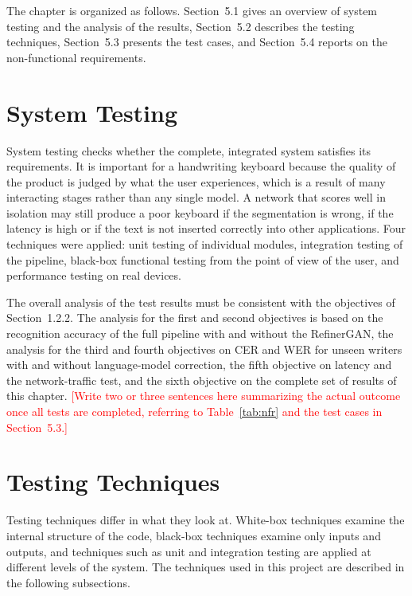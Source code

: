 \documentclass[12pt,a4paper]{report}
\newcommand{\todo}[1]{\textcolor{red}{[#1]}}
\begin{document}
The chapter is organized as follows. Section~5.1 gives an overview of system testing and the analysis of the results, Section~5.2 describes the testing techniques, Section~5.3 presents the test cases, and Section~5.4 reports on the non-functional requirements.

\section{System Testing}
System testing checks whether the complete, integrated system satisfies its requirements. It is important for a handwriting keyboard because the quality of the product is judged by what the user experiences, which is a result of many interacting stages rather than any single model. A network that scores well in isolation may still produce a poor keyboard if the segmentation is wrong, if the latency is high or if the text is not inserted correctly into other applications. Four techniques were applied: unit testing of individual modules, integration testing of the pipeline, black-box functional testing from the point of view of the user, and performance testing on real devices.

The overall analysis of the test results must be consistent with the objectives of Section~1.2.2. The analysis for the first and second objectives is based on the recognition accuracy of the full pipeline with and without the RefinerGAN, the analysis for the third and fourth objectives on CER and WER for unseen writers with and without language-model correction, the fifth objective on latency and the network-traffic test, and the sixth objective on the complete set of results of this chapter. \todo{Write two or three sentences here summarizing the actual outcome once all tests are completed, referring to Table~\ref{tab:nfr} and the test cases in Section~5.3.}

\section{Testing Techniques}
Testing techniques differ in what they look at. White-box techniques examine the internal structure of the code, black-box techniques examine only inputs and outputs, and techniques such as unit and integration testing are applied at different levels of the system. The techniques used in this project are described in the following subsections.
\end{document}
